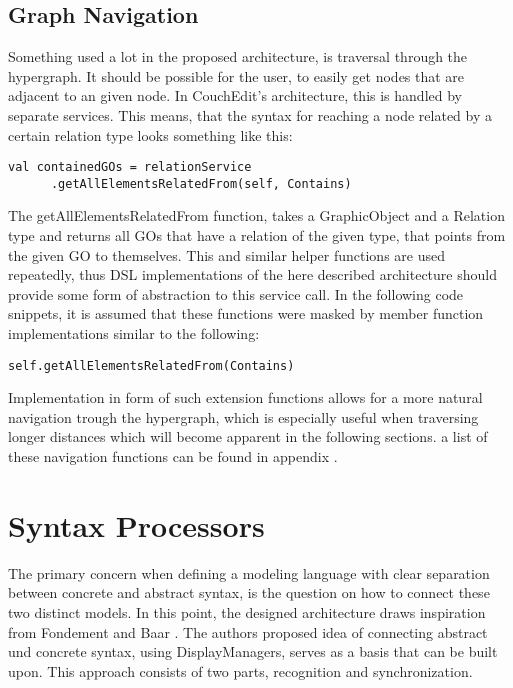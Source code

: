 \subsection{Graph Navigation}
\label{sec:abstraction}
Something used a lot in the proposed architecture, is traversal through the hypergraph. It should be possible for the user, to easily get nodes that are adjacent to an given node. In CouchEdit's architecture, this is handled by separate services. This means, that the syntax for reaching a node related by a certain relation type looks something like this: 
\begin{lstlisting}[language=customLang]
val containedGOs = relationService
      .getAllElementsRelatedFrom(self, Contains) 
\end{lstlisting} 
The getAllElementsRelatedFrom function, takes a GraphicObject and a Relation type and returns all GOs that have a relation of the given type, that points from the given GO to themselves. This and similar helper functions are used repeatedly, thus DSL implementations of the here described architecture should provide some form of abstraction to this service call. In the following code snippets, it is assumed that these functions were masked by member function implementations similar to the following:
\begin{lstlisting}
self.getAllElementsRelatedFrom(Contains)
\end{lstlisting}
Implementation in form of such extension functions allows for a more natural navigation trough the hypergraph, which is especially useful when traversing longer distances which will become apparent in the following sections. a list of these navigation functions can be found in appendix .


\section{Syntax Processors}
The primary concern when defining a modeling language with clear separation between concrete and abstract syntax, is the question on how to connect these two distinct models. In this point, the designed architecture draws inspiration from Fondement and Baar \cite{fondement_making_2005}. The authors proposed idea of connecting abstract und concrete syntax, using DisplayManagers, serves as a basis that can be built upon. This approach consists of two parts, recognition and synchronization. 

